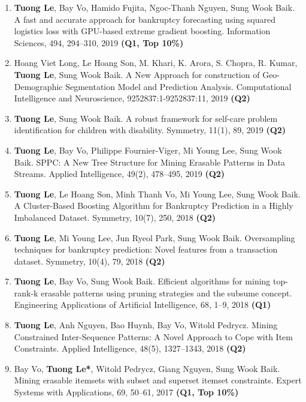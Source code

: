 \documentclass[letterpaper]{article}
\begin{document}
\begin{enumerate}
\item \textbf{Tuong Le}, Bay Vo, Hamido Fujita, Ngoc-Thanh Nguyen, Sung Wook Baik. A fast and accurate approach for bankruptcy forecasting using squared logistics loss with GPU-based extreme gradient boosting. Information Sciences, 494, 294--310, 2019 \textbf{(Q1, Top 10\%)}

\item Hoang Viet Long, Le Hoang Son, M. Khari, K. Arora, S. Chopra, R. Kumar, \textbf{Tuong Le}, Sung Wook Baik. A New Approach for construction of Geo-Demographic Segmentation Model and Prediction Analysis. Computational Intelligence and Neuroscience, 9252837:1-9252837:11, 2019 \textbf{(Q2)}

\item \textbf{Tuong Le}, Sung Wook Baik. A robust framework for self-care problem identification for children with disability. Symmetry, 11(1), 89, 2019 \textbf{(Q2)}

\item \textbf{Tuong Le}, Bay Vo, Philippe Fournier-Viger, Mi Young Lee, Sung Wook Baik. SPPC: A New Tree Structure for Mining Erasable Patterns in Data Streams. Applied Intelligence, 49(2), 478--495, 2019 \textbf{(Q2)}

\item \textbf{Tuong Le}, Le Hoang Son, Minh Thanh Vo, Mi Young Lee, Sung Wook Baik. A Cluster-Based Boosting Algorithm for Bankruptcy Prediction in a Highly Imbalanced Dataset. Symmetry, 10(7), 250, 2018 \textbf{(Q2)}

\item \textbf{Tuong Le}, Mi Young Lee, Jun Ryeol Park, Sung Wook Baik. Oversampling techniques for bankruptcy prediction: Novel features from a transaction dataset. Symmetry, 10(4), 79, 2018 \textbf{(Q2)}

\item \textbf{Tuong Le}, Bay Vo, Sung Wook Baik. Efficient algorithms for mining top-rank-k erasable patterns using pruning strategies and the subsume concept. Engineering Applications of Artificial Intelligence, 68, 1--9, 2018 \textbf{(Q1)}

\item \textbf{Tuong Le}, Anh Nguyen, Bao Huynh, Bay Vo, Witold Pedrycz. Mining Constrained Inter-Sequence Patterns: A Novel Approach to Cope with Item Constraints. Applied Intelligence, 48(5), 1327--1343, 2018 \textbf{(Q2)}

\item Bay Vo, \textbf{Tuong Le*}, Witold Pedrycz, Giang Nguyen, Sung Wook Baik. Mining erasable itemsets with subset and superset itemset constraints. Expert Systems with Applications, 69, 50--61, 2017 \textbf{(Q1, Top 10\%)}


\end{enumerate}
\end{document}
